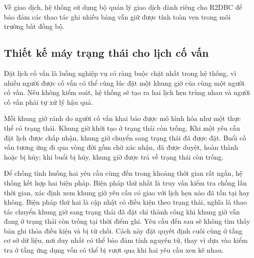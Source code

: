 \documentclass[12pt,a4paper,oneside]{report}
\begin{document}
Về giao dịch, hệ thống sử dụng bộ quản lý giao dịch dành riêng cho R2DBC để bảo đảm các thao tác ghi nhiều bảng vẫn giữ được tính toàn vẹn trong môi trường bất đồng bộ.

\subsection{Thiết kế máy trạng thái cho lịch cố vấn}

Đặt lịch cố vấn là luồng nghiệp vụ có ràng buộc chặt nhất trong hệ thống, vì nhiều người được cố vấn có thể cùng lúc đặt một khung giờ của cùng một người cố vấn. Nếu không kiểm soát, hệ thống sẽ tạo ra hai lịch hẹn trùng nhau và người cố vấn phải tự xử lý hậu quả.

Mỗi khung giờ rảnh do người cố vấn khai báo được mô hình hóa như một thực thể có trạng thái. Khung giờ khởi tạo ở trạng thái còn trống. Khi một yêu cầu đặt lịch được chấp nhận, khung giờ chuyển sang trạng thái đã được đặt. Buổi cố vấn tương ứng đi qua vòng đời gồm chờ xác nhận, đã được duyệt, hoàn thành hoặc bị hủy; khi buổi bị hủy, khung giờ được trả về trạng thái còn trống.

Để chống tình huống hai yêu cầu cùng đến trong khoảng thời gian rất ngắn, hệ thống kết hợp hai biện pháp. Biện pháp thứ nhất là truy vấn kiểm tra chồng lấn thời gian, xác định xem khung giờ yêu cầu có giao với lịch hẹn nào đã tồn tại hay không. Biện pháp thứ hai là cập nhật có điều kiện theo trạng thái, nghĩa là thao tác chuyển khung giờ sang trạng thái đã đặt chỉ thành công khi khung giờ vẫn đang ở trạng thái còn trống tại thời điểm ghi. Yêu cầu đến sau sẽ không tìm thấy bản ghi thỏa điều kiện và bị từ chối. Cách này đặt quyết định cuối cùng ở tầng cơ sở dữ liệu, nơi duy nhất có thể bảo đảm tính nguyên tử, thay vì dựa vào kiểm tra ở tầng ứng dụng vốn có thể bị vượt qua khi hai yêu cầu xen kẽ nhau.
\end{document}
